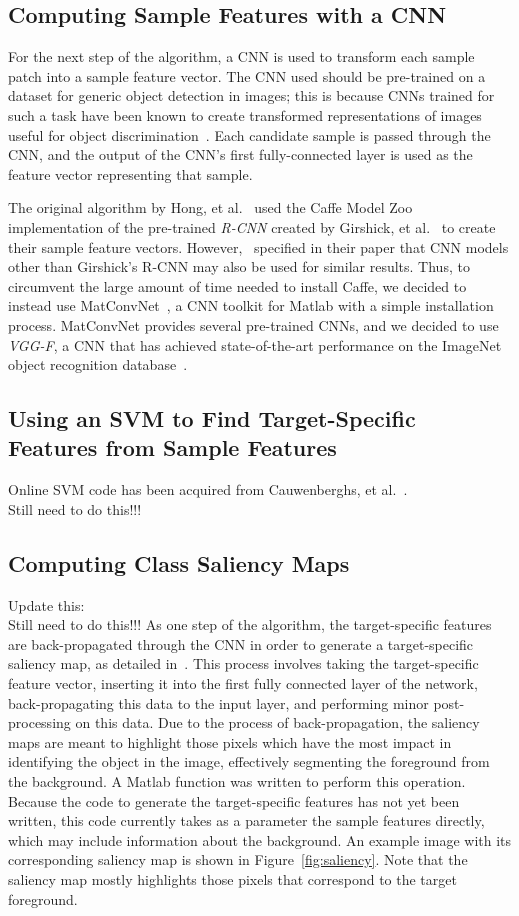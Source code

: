 \documentclass{sig-alternate-05-2015}
\newcommand{\todo}{{\\ \huge \color{red} Still need to do this!!!}} %
\begin{document}
\subsection{Computing Sample Features with a CNN}
For the next step of the algorithm, a CNN is used to transform each sample patch into a sample feature vector.
The CNN used should be pre-trained on a dataset for generic object detection in images; this is because CNNs trained for such a task have been known to create transformed representations of images useful for object discrimination~\cite{krizhevsky2012imagenet}.
Each candidate sample is passed through the CNN, and the output of the CNN's first fully-connected layer is used as the feature vector representing that sample.

The original algorithm by Hong, et al.~\cite{hong2015online} used the Caffe Model Zoo implementation of the pre-trained \textit{R-CNN} created by Girshick, et al.~\cite{girshick2016region} to create their sample feature vectors.
However,~\cite{hong2015online} specified in their paper that CNN models other than Girshick's R-CNN may also be used for similar results.
Thus, to circumvent the large amount of time needed to install Caffe, we decided to instead use MatConvNet~\cite{vedaldi2015matconvnet}, a CNN toolkit for Matlab with a simple installation process.
MatConvNet provides several pre-trained CNNs, and we decided to use \textit{VGG-F}, a CNN that has achieved state-of-the-art performance on the ImageNet object recognition database~\cite{chatfield2014return}.

\subsection{Using an SVM to Find Target-Specific Features from Sample Features}
Online SVM code has been acquired from Cauwenberghs, et al.~\cite{cauwenberghs2001incremental}. 
\todo

\subsection{Computing Class Saliency Maps}
Update this:
\todo
As one step of the algorithm, the target-specific features are back-propagated through the CNN in order to generate a target-specific saliency map, as detailed in~\cite{simonyan2013deep}.
This process involves taking the target-specific feature vector, inserting it into the first fully connected layer of the network, back-propagating this data to the input layer, and performing minor post-processing on this data.
Due to the process of back-propagation, the saliency maps are meant to highlight those pixels which have the most impact in identifying the  object in the image, effectively segmenting the foreground from the background.
A Matlab function was written to perform this operation.
Because the code to generate the target-specific features has not yet been written, this code currently takes as a parameter the sample features directly, which may include information about the background.
An example image with its corresponding saliency map is shown in Figure~\ref{fig:saliency}.
Note that the saliency map mostly highlights those pixels that correspond to the target foreground.
\end{document}
